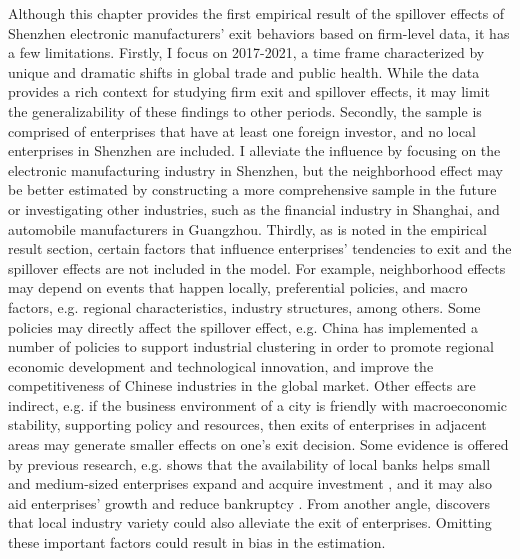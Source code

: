 Although this chapter provides the first empirical result of the spillover effects of Shenzhen electronic manufacturers' exit behaviors based on firm-level data, it has a few limitations. Firstly, I focus on 2017-2021, a time frame characterized by unique and dramatic shifts in global trade and public health. While the data provides a rich context for studying firm exit and spillover effects, it may limit the generalizability of these findings to other periods. Secondly, the sample is comprised of enterprises that have at least one foreign investor, and no local enterprises in Shenzhen are included. I alleviate the influence by focusing on the electronic manufacturing industry in Shenzhen, but the neighborhood effect may be better estimated by constructing a more comprehensive sample in the future or investigating other industries, such as the financial industry in Shanghai, and automobile manufacturers in Guangzhou. Thirdly, as is noted in the empirical result section, certain factors that influence enterprises' tendencies to exit and the spillover effects are not included in the model. For example, neighborhood effects may depend on events that happen locally, preferential policies, and macro factors, e.g. regional characteristics, industry structures, among others. Some policies may directly affect the spillover effect, e.g. China has implemented a number of policies to support industrial clustering in order to promote regional economic development and technological innovation, and improve the competitiveness of Chinese industries in the global market. Other effects are indirect, e.g. if the business environment of a city is friendly with macroeconomic stability, supporting policy and resources, then exits of enterprises in adjacent areas may generate smaller effects on one's exit decision. Some evidence is offered by previous research, e.g. \cite{fafchamps2013local} shows that the availability of local banks helps small and medium-sized enterprises expand and acquire investment \cite{fafchamps2013local}, and it may also aid enterprises' growth and reduce bankruptcy \cite{arcuri2020early}. From another angle, \cite{basile2017agglomeration} discovers that local industry variety could also alleviate the exit of enterprises. Omitting these important factors could result in bias in the estimation.

\newpage
  
  



